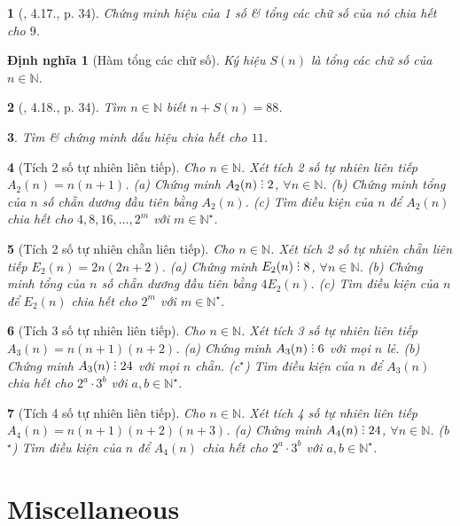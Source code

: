 \documentclass{article}
\newtheorem{baitoan}{}
\newtheorem{dinhnghia}{Định nghĩa}
\DeclareRobustCommand{\divby}{%
	\mathrel{\vbox{\baselineskip.65ex\lineskiplimit0pt\hbox{.}\hbox{.}\hbox{.}}}%
}
\begin{document}
\begin{baitoan}[\cite{Binh_boi_duong_Toan_6_tap_1}, 4.17., p. 34]
	Chứng minh hiệu của 1 số \& tổng các chữ số của nó chia hết cho $9$.
\end{baitoan}

\begin{dinhnghia}[Hàm tổng các chữ số]
	Ký hiệu $S(n)$ là tổng các chữ số của $n\in\mathbb{N}$.
\end{dinhnghia}

\begin{baitoan}[\cite{Binh_boi_duong_Toan_6_tap_1}, 4.18., p. 34]
	 Tìm $n\in\mathbb{N}$ biết $n + S(n) = 88$.
\end{baitoan}

\begin{baitoan}
	Tìm \& chứng minh dấu hiệu chia hết cho $11$.
\end{baitoan}

\begin{baitoan}[Tích 2 số tự nhiên liên tiếp]
	Cho $n\in\mathbb{N}$. Xét tích 2 số tự nhiên liên tiếp $A_2(n) = n(n + 1)$. (a) Chứng minh $A_2(n)\divby2$, $\forall n\in\mathbb{N}$. (b) Chứng minh tổng của $n$ số chẵn dương đầu tiên bằng $A_2(n)$. (c) Tìm điều kiện của $n$ để $A_2(n)$ chia hết cho $4,8,16,\ldots,2^m$ với $m\in\mathbb{N}^\star$.
\end{baitoan}

\begin{baitoan}[Tích 2 số tự nhiên chẵn liên tiếp]
	Cho $n\in\mathbb{N}$. Xét tích 2 số tự nhiên chẵn liên tiếp $E_2(n) = 2n(2n + 2)$. (a) Chứng minh $E_2(n)\divby8$, $\forall n\in\mathbb{N}$. (b) Chứng minh tổng của $n$ số chẵn dương đầu tiên bằng $4E_2(n)$. (c) Tìm điều kiện của $n$ để $E_2(n)$ chia hết cho $2^m$ với $m\in\mathbb{N}^\star$.
\end{baitoan}

\begin{baitoan}[Tích 3 số tự nhiên liên tiếp]
	Cho $n\in\mathbb{N}$. Xét tích 3 số tự nhiên liên tiếp $A_3(n) = n(n + 1)(n + 2)$. (a) Chứng minh $A_3(n)\divby6$ với mọi $n$ lẻ. (b) Chứng minh $A_3(n)\divby24$ với mọi $n$ chẵn. (c${}^\star$) Tìm điều kiện của $n$ để $A_3(n)$ chia hết cho $2^a\cdot3^b$ với $a,b\in\mathbb{N}^\star$.
\end{baitoan}

\begin{baitoan}[Tích 4 số tự nhiên liên tiếp]
	Cho $n\in\mathbb{N}$. Xét tích 4 số tự nhiên liên tiếp $A_4(n) = n(n + 1)(n + 2)(n + 3)$. (a) Chứng minh $A_4(n)\divby24$, $\forall n\in\mathbb{N}$. (b${}^\star$) Tìm điều kiện của $n$ để $A_4(n)$ chia hết cho $2^a\cdot3^b$ với $a,b\in\mathbb{N}^\star$.
\end{baitoan}


\section{Miscellaneous}


\printbibliography[heading=bibintoc]
\end{document}
